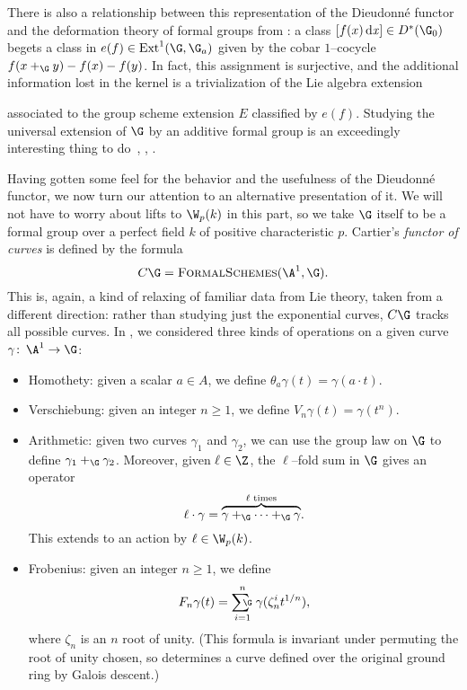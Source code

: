 \begin{remark}\label{ExtensionsPresentationOfDieudonne}
There is also a relationship between this representation of the Dieudonn\'e functor and the deformation theory of formal groups from : a class \([f(x)\dx] \in D^*(\G_0)\) begets a class in \(e(f) \in \Ext^1(\G, \G_a)\) given by the cobar \(1\)--cocycle \(f(x +_{\G} y) - f(x) - f(y)\).  In fact, this assignment is surjective, and the additional information lost in the kernel is a trivialization of the Lie algebra extension
\begin{center}
\end{center}
associated to the group scheme extension \(E\) classified by \(e(f)\).  Studying the universal extension of \(\G\) by an additive formal group is an exceedingly interesting thing to do~\cite[Section V.4]{GrothendieckCristaux}, \cite{MazurMessing}, \cite[Section 11]{HopkinsGrossEquivVBs}.
\end{remark}

Having gotten some feel for the behavior and the usefulness of the Dieudonn\'e functor, we now turn our attention to an alternative presentation of it.  We will not have to worry about lifts to \(\W_p(k)\) in this part, so we take \(\G\) itself to be a formal group over a perfect field \(k\) of positive characteristic \(p\).  Cartier's \textit{functor of curves} is defined by the formula \[C\G = \CatOf{FormalSchemes}(\A^1, \G).\]  This is, again, a kind of relaxing of familiar data from Lie theory, taken from a different direction: rather than studying just the exponential curves, \(C\G\) tracks all possible curves.  In , we considered three kinds of operations on a given curve \(\gamma\co \A^1 \to \G\):
\begin{itemize}
\item {}Homothety: given a scalar \(a \in A\), we define \(\theta_a \gamma(t) = \gamma(a \cdot t)\).
\item {}Verschiebung: given an integer \(n \ge 1\), we define \(V_n \gamma(t) = \gamma(t^n)\).
\item {}Arithmetic: given two curves \(\gamma_1\) and \(\gamma_2\), we can use the group law on \(\G\) to define \(\gamma_1 +_{\G} \gamma_2\).  Moreover, given \(\ell \in \Z\), the \(\ell\)--fold sum in \(\G\) gives an operator \[\ell \cdot \gamma = \overset{\text{\(\ell\) times}}{\overbrace{\gamma +_{\G} \cdots +_{\G} \gamma}}.\]  This extends to an action by \(\ell \in \W_p(k)\).
\item {}Frobenius: given an integer \(n \ge 1\), we define \[F_n \gamma(t) = \sumG_{i=1}^n \gamma(\zeta_n^i t^{1/n}),\] where \(\zeta_{n}\) is an \(n\){\th} root of unity.  (This formula is invariant under permuting the root of unity chosen, so determines a curve defined over the original ground ring by Galois descent.)
\end{itemize}


